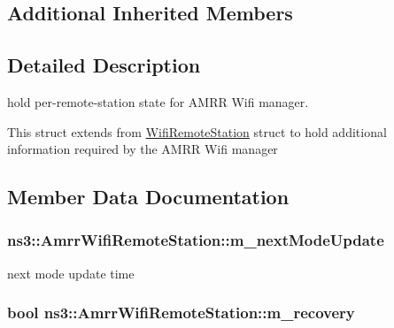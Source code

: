 \subsection*{Additional Inherited Members}


\subsection{Detailed Description}
hold per-\/remote-\/station state for A\+M\+RR Wifi manager. 

This struct extends from \hyperlink{structns3_1_1WifiRemoteStation}{Wifi\+Remote\+Station} struct to hold additional information required by the A\+M\+RR Wifi manager 

\subsection{Member Data Documentation}
\subsubsection[{\texorpdfstring{m\+\_\+next\+Mode\+Update}{m_nextModeUpdate}}]{ ns3\+::\+Amrr\+Wifi\+Remote\+Station\+::m\+\_\+next\+Mode\+Update}\hypertarget{structns3_1_1AmrrWifiRemoteStation_a88efb67884ce8a8c48aadcd0b8b3b8b0}{}\label{structns3_1_1AmrrWifiRemoteStation_a88efb67884ce8a8c48aadcd0b8b3b8b0}


next mode update time 

\subsubsection[{\texorpdfstring{m\+\_\+recovery}{m_recovery}}]{\setlength{\rightskip}{0pt plus 5cm}bool ns3\+::\+Amrr\+Wifi\+Remote\+Station\+::m\+\_\+recovery}\hypertarget{structns3_1_1AmrrWifiRemoteStation_aa8b710ef1e1fb1adfa221f7189f70487}{}\label{structns3_1_1AmrrWifiRemoteStation_aa8b710ef1e1fb1adfa221f7189f70487}


